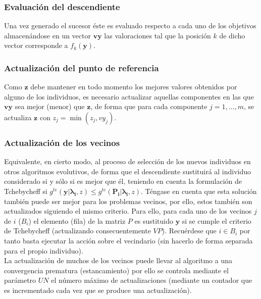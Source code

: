 \subsubsection{Evaluación del descendiente}

Una vez generado el sucesor éste es evaluado respecto a cada uno de los objetivos almacenándose en un vector $\boldsymbol{vy}$ las valoraciones tal que la posición $k$ de dicho vector corresponde a $f_k(\boldsymbol{y})$.\\

\subsubsection{Actualización del punto de referencia}

Como $\boldsymbol{z}$ debe mantener en todo momento los mejores valores obtenidos por alguno de los individuos, es necesario actualizar aquellas componentes en las que $\boldsymbol{vy}$ sea mejor (menor) que $\boldsymbol{z}$, de forma que para cada componente $j=1, \dots, m$, se actualiza $\boldsymbol{z}$ con $z_j = \min(z_j, vy_j)$.\\

\subsubsection{Actualización de los vecinos}

Equivalente, en cierto modo, al proceso de selección de los nuevos individuos en otros algoritmos evolutivos, de forma que el descendiente sustituirá al individuo considerado si y sólo si es mejor que él, teniendo en cuenta la formulación de Tchebycheff si $g^{te}(\boldsymbol{y}|\boldsymbol{\lambda_i},z) \leq g^{te}(\boldsymbol{P_i}|\boldsymbol{\lambda_i},z)$. Téngase en cuenta que esta solución también puede ser mejor para los problemas vecinos, por ello, estos también son actualizados siguiendo el mismo criterio. Para ello, para cada uno de los vecinos $j$ de $i$ ($B_i$) el elemento (fila) de la matriz $P$ es sustituido $\boldsymbol{y}$ si se cumple el criterio de Tchebycheff (actualizando consecuentemente $VP$). Recuérdese que $i \in B_i$ por tanto basta ejecutar la acción sobre el vecindario (sin hacerlo de forma separada para el propio individuo).\\

La actualización de muchos de los vecinos puede llevar al algoritmo a una convergencia prematura (estancamiento) por ello se controla mediante el parámetro $UN$ el número máximo de actualizaciones (mediante un contador que es incrementado cada vez que se produce una actualización).\\

